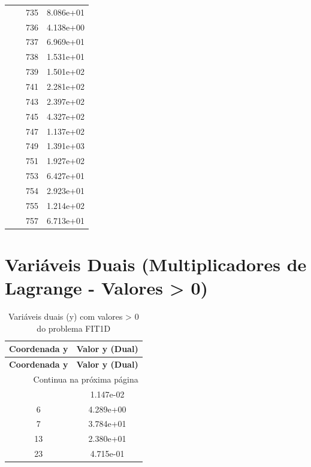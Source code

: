 \documentclass[12pt]{article}
\begin{document}
\begin{longtable}{@{}cccc@{}}
 &  & 735 & 8.086e+01 \\
 &  & 736 & 4.138e+00 \\
 &  & 737 & 6.969e+01 \\
 &  & 738 & 1.531e+01 \\
 &  & 739 & 1.501e+02 \\
 &  & 741 & 2.281e+02 \\
 &  & 743 & 2.397e+02 \\
 &  & 745 & 4.327e+02 \\
 &  & 747 & 1.137e+02 \\
 &  & 749 & 1.391e+03 \\
 &  & 751 & 1.927e+02 \\
 &  & 753 & 6.427e+01 \\
 &  & 754 & 2.923e+01 \\
 &  & 755 & 1.214e+02 \\
 &  & 757 & 6.713e+01 \\

\bottomrule
\end{longtable}


\section{Variáveis Duais (Multiplicadores de Lagrange - Valores > 0)}

\begin{longtable}{@{}cc@{}}
\caption{Variáveis duais (y) com valores > 0 do problema FIT1D} \\
\toprule
\textbf{Coordenada y} & \textbf{Valor y (Dual)} \\
\midrule
\endfirsthead

\toprule
\textbf{Coordenada y} & \textbf{Valor y (Dual)} \\
\midrule
\endhead

\midrule \multicolumn{2}{r}{{Continua na próxima página}} \\ \midrule
\endfoot

\bottomrule
\endlastfoot
5 & 1.147e-02 \\
6 & 4.289e+00 \\
7 & 3.784e+01 \\
13 & 2.380e+01 \\
23 & 4.715e-01 \\

\bottomrule
\end{longtable}
\end{document}
